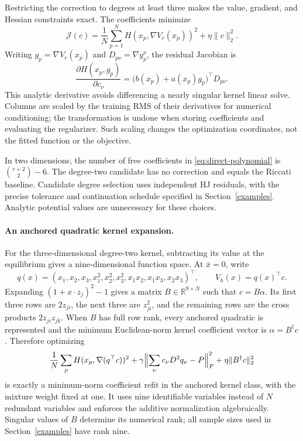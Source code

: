 \documentclass[11pt]{article}
\theoremstyle{plain}      %
\theoremstyle{definition} %
\begin{document}
Restricting the correction to degrees at least three makes the value, gradient, and Hessian constraints exact. The coefficients minimize
\begin{equation}\label{eq:direct-objective}
 \mathcal J(c)=\frac1N\sum_{p=1}^N
 H(x_p,\nabla V_r(x_p))^2+\eta\|c\|_2^2.
\end{equation}
Writing $g_p=\nabla V_r(x_p)$ and $D_{p\nu}=\nabla y_p^\nu$, the residual Jacobian is
\[
 \frac{\partial H(x_p,g_p)}{\partial c_\nu}
 =\bigl(b(x_p)+a(x_p)g_p\bigr)^\top D_{p\nu}.
\]
This analytic derivative avoids differencing a nearly singular kernel linear solve. Columns are scaled by the training RMS of their derivatives for numerical conditioning; the transformation is undone when storing coefficients and evaluating the regularizer. Such scaling changes the optimization coordinates, not the fitted function or the objective.

In two dimensions, the number of free coefficients in \eqref{eq:direct-polynomial} is $\binom{r+2}{2}-6$. The degree-two candidate has no correction and equals the Riccati baseline. Candidate degree selection uses independent HJ residuals, with the precise tolerance and continuation schedule specified in Section~\ref{examples}. Analytic potential values are unnecessary for these choices.

\paragraph{An anchored quadratic kernel expansion.}
For the three-dimensional degree-two kernel, subtracting its value at the equilibrium gives a nine-dimensional function space. At $\bar x=0$, write
\[
 q(x)=(x_1,x_2,x_3,x_1^2,x_2^2,x_3^2,x_1x_2,x_1x_3,x_2x_3)^\top,
 \qquad V_h(x)=q(x)^\top c.
\]
Expanding $(1+x\cdot z_j)^2-1$ gives a matrix $B\in\mathbb R^{9\times N}$ such that $c=B\alpha$. Its first three rows are $2z_{ji}$, the next three are $z_{ji}^2$, and the remaining rows are the cross products $2z_{ji}z_{jk}$. When $B$ has full row rank, every anchored quadratic is represented and the minimum Euclidean-norm kernel coefficient vector is $\alpha=B^\dagger c$. Therefore optimizing
\[
 \frac1N\sum_p H(x_p,\nabla(q^\top c))^2
 +\gamma\Bigl\|\sum_\nu c_\nu D^2q_\nu-P\Bigr\|_F^2
 +\eta\|B^\dagger c\|_2^2
\]
is exactly a minimum-norm coefficient refit in the anchored kernel class, with the mixture weight fixed at one. It uses nine identifiable variables instead of $N$ redundant variables and enforces the additive normalization algebraically. Singular values of $B$ determine its numerical rank; all sample sizes used in Section~\ref{examples} have rank nine.
\end{document}
